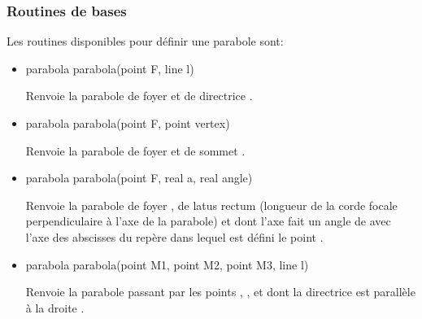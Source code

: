 \documentclass[pdftex]{article}
\begin{document}
\subsubsection{Routines de bases}
Les routines disponibles pour définir une parabole sont:
\begin{itemize}
\item {}
  \begin{Vcolor}
    parabola parabola(point F, line l)
  \end{Vcolor}
  Renvoie la parabole de foyer  et de directrice .
\item {}
  \begin{Vcolor}
    parabola parabola(point F, point vertex)
  \end{Vcolor}
  Renvoie la parabole de foyer  et de sommet .
\item {}
  \begin{Vcolor}
    parabola parabola(point F, real a, real angle)
  \end{Vcolor}
  Renvoie la parabole de foyer , de latus rectum 
  (longueur de la corde focale perpendiculaire à l'axe de la parabole)
  et dont l'axe fait un angle de  avec l'axe des
  abscisses du repère dans lequel est défini le point .
\item {}
  \begin{Vcolor}
    parabola parabola(point M1, point M2, point M3, line l)
  \end{Vcolor}
  Renvoie la parabole passant par les
  points , ,  et dont la directrice est
  parallèle à la droite .
\end{itemize}
\end{document}
